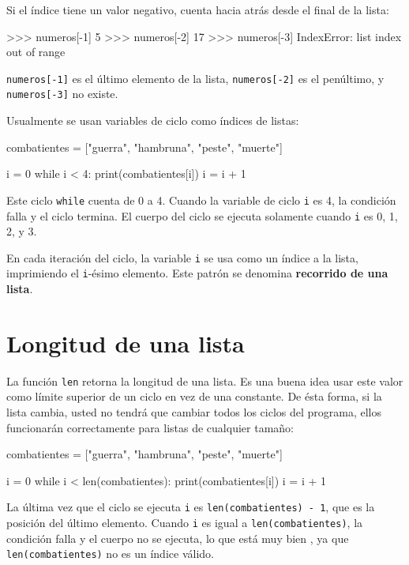 Si el índice tiene un valor negativo, cuenta hacia atrás desde el
final de la lista:
\begin{pyconcode}
>>> numeros[-1]
5
>>> numeros[-2]
17
>>> numeros[-3]
IndexError: list index out of range
\end{pyconcode}

\texttt{numeros{[}-1{]}} es el último elemento de la lista, \texttt{numeros{[}-2{]}}
es el penúltimo, y \texttt{numeros{[}-3{]}} no existe.

Usualmente se usan variables de ciclo como índices de listas:
\begin{pythoncode}
combatientes = ["guerra", "hambruna", "peste", "muerte"]

i = 0
while i < 4:
  print(combatientes[i])
  i = i + 1
\end{pythoncode}

Este ciclo \texttt{while} cuenta de 0 a 4. Cuando la variable de ciclo
\texttt{i} es 4, la condición falla y el ciclo termina. El cuerpo
del ciclo se ejecuta solamente cuando \texttt{i} es 0, 1, 2, y 3.

En cada iteración del ciclo, la variable \texttt{i} se usa como un
índice a la lista, imprimiendo el \texttt{i}-ésimo elemento. Este
patrón se denomina \textbf{recorrido de una lista}.

 

\section{Longitud de una lista}

 

La función \texttt{len} retorna la longitud de una lista. Es una buena
idea usar este valor como límite superior de un ciclo en vez de una
constante. De ésta forma, si la lista cambia, usted no tendrá que
cambiar todos los ciclos del programa, ellos funcionarán correctamente
para listas de cualquier tamaño:
\begin{pythoncode}
combatientes = ["guerra", "hambruna", "peste", "muerte"]

i = 0
while i < len(combatientes):
  print(combatientes[i])
  i = i + 1
\end{pythoncode}

La última vez que el ciclo se ejecuta \texttt{i} es \texttt{len(combatientes)
- 1}, que es la posición del último elemento. Cuando \texttt{i} es
igual a \texttt{len(combatientes)}, la condición falla y el cuerpo
no se ejecuta, lo que está muy bien , ya que \texttt{len(combatientes)}
no es un índice válido.

